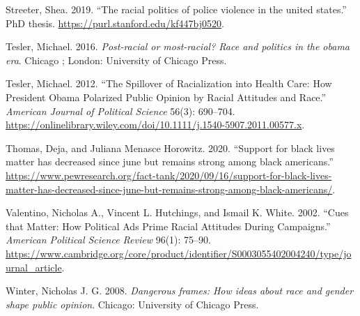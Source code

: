 \documentclass[
  12pt,
]{article}
\newlength{\cslhangindent}
\newlength{\cslentryspacingunit} %
\newenvironment{CSLReferences}[2] %
 {%
  \setlength{\parindent}{0pt}
  \ifodd #1
  \let\oldpar\par
  \def\par{\hangindent=\cslhangindent\oldpar}
  \fi
  \setlength{\parskip}{#2\cslentryspacingunit}
 }%
 {}
\begin{document}
\begin{CSLReferences}{1}{0}
\leavevmode{}%
Streeter, Shea. 2019. {``The racial politics of police violence in the
united states.''} PhD thesis.
\url{https://purl.stanford.edu/kf447bj0520}.

\leavevmode{}%
Tesler, Michael. 2016. \emph{Post-racial or most-racial? Race and
politics in the obama era}. Chicago ; London: University of Chicago
Press.

\leavevmode{}%
Tesler, Michael. 2012. {``The Spillover of Racialization into Health
Care: How President Obama Polarized Public Opinion by Racial Attitudes
and Race.''} \emph{American Journal of Political Science} 56(3):
690--704.
\url{https://onlinelibrary.wiley.com/doi/10.1111/j.1540-5907.2011.00577.x}.

\leavevmode{}%
Thomas, Deja, and Juliana Menasce Horowitz. 2020. {``Support for black
lives matter has decreased since june but remains strong among black
americans.''}
\url{https://www.pewresearch.org/fact-tank/2020/09/16/support-for-black-lives-matter-has-decreased-since-june-but-remains-strong-among-black-americans/}.

\leavevmode{}%
Valentino, Nicholas A., Vincent L. Hutchings, and Ismail K. White. 2002.
{``Cues that Matter: How Political Ads Prime Racial Attitudes During
Campaigns.''} \emph{American Political Science Review} 96(1): 75--90.
\url{https://www.cambridge.org/core/product/identifier/S0003055402004240/type/journal_article}.

\leavevmode{}%
Winter, Nicholas J. G. 2008. \emph{Dangerous frames: How ideas about
race and gender shape public opinion}. Chicago: University of Chicago
Press.

\end{CSLReferences}
\end{document}
